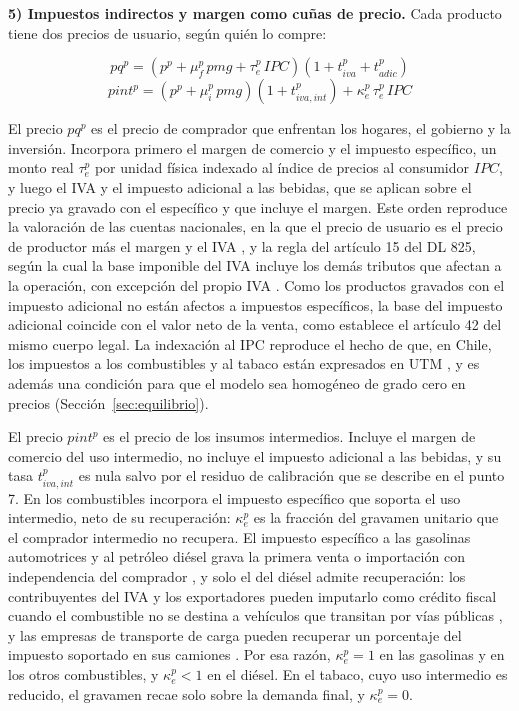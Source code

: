 \documentclass[11pt]{article}
\begin{document}
\textbf{5) Impuestos indirectos y margen como cuñas de precio.} Cada producto tiene dos precios de usuario, según quién lo compre:

\[
pq^{p}=\left(p^{p}+\mu_{f}^{p}\,pmg+\tau_{e}^{p}\,IPC\right)\left(1+t_{iva}^{p}+t_{adic}^{p}\right)
\]
\[
pint^{p}=\left(p^{p}+\mu_{i}^{p}\,pmg\right)\left(1+t_{iva,int}^{p}\right)+\kappa_{e}^{p}\,\tau_{e}^{p}\,IPC
\]

El precio $pq^{p}$ es el precio de comprador que enfrentan los hogares, el gobierno y la inversión. Incorpora primero el margen de comercio y el impuesto específico, un monto real $\tau_{e}^{p}$ por unidad física indexado al índice de precios al consumidor $IPC$, y luego el IVA y el impuesto adicional a las bebidas, que se aplican sobre el precio ya gravado con el específico y que incluye el margen. Este orden reproduce la valoración de las cuentas nacionales, en la que el precio de usuario es el precio de productor más el margen y el IVA \cite{sna_2008}, y la regla del artículo 15 del DL 825, según la cual la base imponible del IVA incluye los demás tributos que afectan a la operación, con excepción del propio IVA \cite{dl825}. Como los productos gravados con el impuesto adicional no están afectos a impuestos específicos, la base del impuesto adicional coincide con el valor neto de la venta, como establece el artículo 42 del mismo cuerpo legal. La indexación al IPC reproduce el hecho de que, en Chile, los impuestos a los combustibles y al tabaco están expresados en UTM \cite{ley18502}, y es además una condición para que el modelo sea homogéneo de grado cero en precios (Sección~\ref{sec:equilibrio}).

El precio $pint^{p}$ es el precio de los insumos intermedios. Incluye el margen de comercio del uso intermedio, no incluye el impuesto adicional a las bebidas, y su tasa $t_{iva,int}^{p}$ es nula salvo por el residuo de calibración que se describe en el punto 7. En los combustibles incorpora el impuesto específico que soporta el uso intermedio, neto de su recuperación: $\kappa_{e}^{p}$ es la fracción del gravamen unitario que el comprador intermedio no recupera. El impuesto específico a las gasolinas automotrices y al petróleo diésel grava la primera venta o importación con independencia del comprador \cite[art.~6]{ley18502}, y solo el del diésel admite recuperación: los contribuyentes del IVA y los exportadores pueden imputarlo como crédito fiscal cuando el combustible no se destina a vehículos que transitan por vías públicas \cite[art.~7]{ley18502}, y las empresas de transporte de carga pueden recuperar un porcentaje del impuesto soportado en sus camiones \cite[art.~2]{ley19764}. Por esa razón, $\kappa_{e}^{p}=1$ en las gasolinas y en los otros combustibles, y $\kappa_{e}^{p}<1$ en el diésel. En el tabaco, cuyo uso intermedio es reducido, el gravamen recae solo sobre la demanda final, y $\kappa_{e}^{p}=0$.
\end{document}
